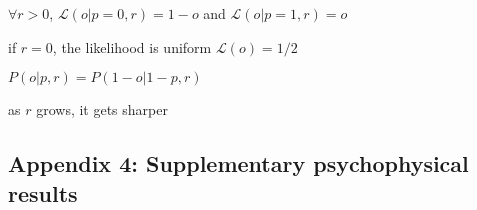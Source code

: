 \documentclass[profile,final,english, draft]{article}%
\newcommand{\Ll}{\mathcal{L}}
\newcommand{\seeApp}[1]{Appendix~\ref{app:#1}}
\begin{document}


$\forall r >0$, $\Ll(o|p=0, r)=1-o$ and $\Ll(o|p=1, r)=o$

if $r=0$, the likelihood is uniform $\Ll(o)=1/2$

$P(o | p, r)=P(1-o | 1-p, r)$

as $r$ grows, it gets sharper

\subsection{Appendix 4: Supplementary psychophysical results}
\label{app:results_psycho}

{\tiny
\printbibliography
}
\end{document}
